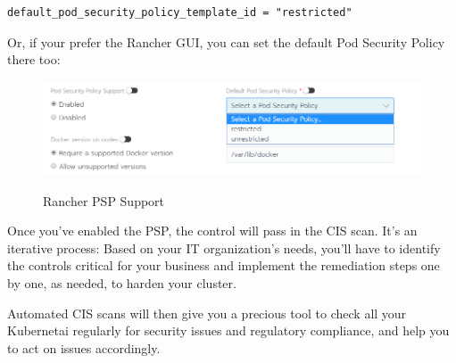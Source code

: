 \begin{lstlisting}[caption=Cluster Template, frame=single, basicstyle=\ttfamily]
default_pod_security_policy_template_id = "restricted"
\end{lstlisting}

Or, if your prefer the Rancher GUI, you can set the default Pod Security Policy there too:

\begin{figure}[H]
\centering
\caption {Rancher PSP Support}
\includegraphics[width=\linewidth]{images/rancher-psp-support.png}
\label{fig:rancherPSP}
\end{figure}

Once you've enabled the PSP, the control will pass in the CIS scan. It's an iterative process: Based on your IT organization's needs, you'll have to identify the controls critical for your business and implement the remediation steps one by one, as needed, to harden your cluster.

Automated CIS scans will then give you a precious tool to check all your Kubernetai regularly for security issues and regulatory compliance, and help you to act on issues accordingly.
